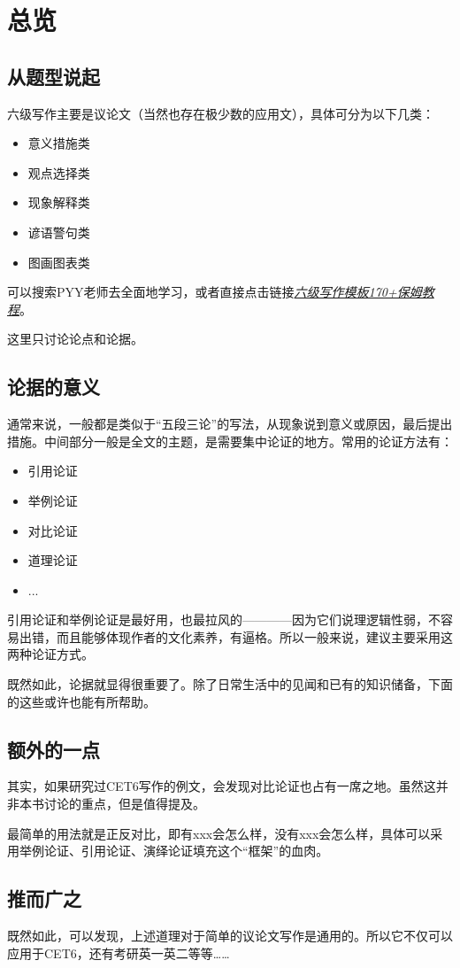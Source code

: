 \graphicspath{{Images/}}

\section{总览}
\subsection{从题型说起}
    六级写作主要是议论文（当然也存在极少数的应用文），具体可分为以下几类：
\begin{itemize}
    \item 意义措施类
    \item 观点选择类
    \item 现象解释类
    \item 谚语警句类
    \item 图画图表类
\end{itemize}
    \par 
    可以搜索PYY老师去全面地学习，或者直接点击链接\href{https://zhuanlan.zhihu.com/p/357293671}{\textit{六级写作模板170+保姆教程}}。
    \par
    这里只讨论论点和论据。
\subsection{论据的意义}
通常来说，一般都是类似于“五段三论”的写法，从现象说到意义或原因，最后提出措施。中间部分一般是全文的主题，是需要集中论证的地方。常用的论证方法有：
\begin{itemize}
    \item 引用论证
    \item 举例论证
    \item 对比论证
    \item 道理论证
    \item ...
\end{itemize}
\par
引用论证和举例论证是最好用，也最拉风的————因为它们说理逻辑性弱，不容易出错，而且能够体现作者的文化素养，有逼格。所以一般来说，建议主要采用这两种论证方式。
\par
既然如此，论据就显得很重要了。除了日常生活中的见闻和已有的知识储备，下面的这些或许也能有所帮助。
\subsection{额外的一点}
其实，如果研究过CET6写作的例文，会发现对比论证也占有一席之地。虽然这并非本书讨论的重点，但是值得提及。
\par
最简单的用法就是正反对比，即有xxx会怎么样，没有xxx会怎么样，具体可以采用举例论证、引用论证、演绎论证填充这个“框架”的血肉。
\subsection{推而广之}
既然如此，可以发现，上述道理对于简单的议论文写作是通用的。所以它不仅可以应用于CET6，还有考研英一英二等等……